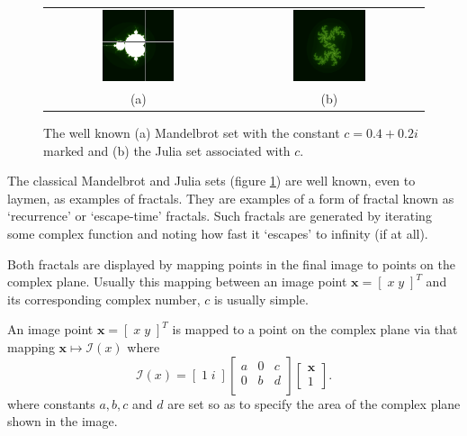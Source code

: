 \begin{figure}
\centering
\begin{tabular}{c@{$\quad$}c}
\includegraphics[width=0.4\textwidth]{euc_mandel_julia_pos} 
 & \includegraphics[width=0.4\textwidth]{julia_euc} \\
                          (a) & (b)
\end{tabular}
\caption{\label{fig:euclidean_sets}The well known (a) Mandelbrot set with
  the constant $c = 0.4 + 0.2i$ marked and (b) the Julia
  set associated with $c$.}
\end{figure}

The classical Mandelbrot and Julia sets (figure \ref{fig:euclidean_sets}) are
well known, even to laymen, as examples of fractals. They are
examples of a form of fractal known as `recurrence' or `escape-time'
fractals.  Such fractals are generated by iterating some complex function and
noting how fast it `escapes' to infinity (if at all).

Both fractals are displayed by mapping points in the final image to points on the
complex plane. Usually this mapping between an image point $\mathbf{x} = [\; x\;y \;]^T$ and
its corresponding complex number, $c$ is usually simple.

\begin{definition}
An image point $\mathbf{x} = [\; x\;y \;]^T$ is mapped to a point on the 
complex plane via that mapping $\mathbf{x} \mapsto {\mathcal I}(x)$ where
\[
{\mathcal I}(x) = [\; 1 \; i \;] \left[ 
  \begin{array}{ccc}
a & 0 & c \\
0 & b & d \\
  \end{array}
\right]
\left[
  \begin{array}{c}
  \mathbf{x} \\ 1
  \end{array}
\right].
\]
where constants $a,b,c$ and $d$ are set so as to specify the area of the complex 
plane shown in the image.
\end{definition}

